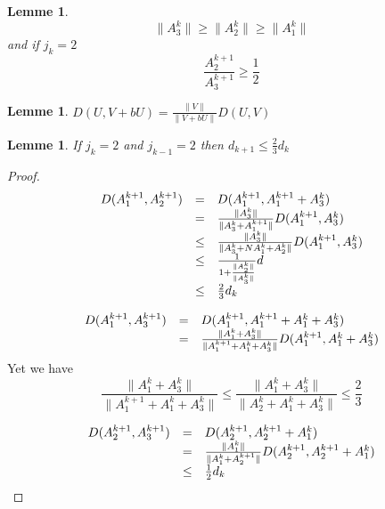 \documentclass[12pt]{article}
\theoremstyle{plain}%
\newtheorem{lem}[thm]{Lemme}
\theoremstyle{definition}
\theoremstyle{remark}
\begin{document}
\begin{lem}
\[
\|A_3^k \| \geq \|A_2^k\| \geq \|A_1^k \|
\]
and if $j_k=2$
\[
\frac{A_2^{k+1}}{A_3^{k+1}} \geq \frac{1}{2}
\]
\end{lem}

\begin{lem}
 $D(U,V+b U)=\frac{\|V\|}{\|V+b U\|}D(U,V)$
\end{lem}
\begin{lem}
If $j_k=2$ and $j_{k-1}=2$ then $d_{k+1} \leq \frac{2}{3} d_k$
\end{lem}
\begin{proof}

\[
\begin{array}{c c l}
D(A_1^{k+1},A_2^{k+1}) & = & D(A_1^{k+1},A_1^{k+1}+A_3^k) \\
& = & \frac{\|A_3^k\|}{\|A_3^k+A_1^{k+1}\|}D(A_1^{k+1},A_3^k)\\
& \leq & \frac{\|A_3^k\|}{\|A_3^k+N A_1^k+A_2^k\|}D(A_1^{k+1},A_3^k)\\
& \leq & \frac{1}{1+\frac{\|A_2^k\|}{\|A_3^k\|}} d\\
& \leq & \frac{2}{3} d_k
\end{array}
\]

\[
\begin{array}{c c l}
D(A_1^{k+1},A_3^{k+1}) & = & D(A_1^{k+1},A_1^{k+1}+A_1^k+A_3^k)\\
 & = & \frac{\|A_1^k+A_3^k\|}{\|A_1^{k+1}+A_1^k+A_3^k\|}  D(A_1^{k+1},A_1^k+A_3^k) \\
\end{array}
\]
Yet we have \[
\frac{\|A_1^k+A_3^k\|}{\|A_1^{k+1}+A_1^k+A_3^k\|} \leq \frac{\|A_1^k+A_3^k\|}{\|A_2^k+A_1^k+A_3^k\|} \leq
\frac{2}{3}
\]


\[
\begin{array}{c c l}
D(A_2^{k+1},A_3^{k+1}) & = & D(A_2^{k+1},A_2^{k+1}+A_1^k) \\
& = &\frac{\|A_1^k\|}{\|A_1^k+A_2^{k+1}\|} D(A_2^{k+1},A_2^{k+1}+A_1^k)\\
& \leq & \frac{1}{2} d_k
\end{array}
\]
\end{proof}
\end{document}
